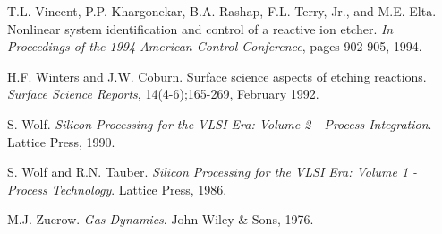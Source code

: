 \begin{thebibliography}{100}
	 T.L. Vincent, P.P. Khargonekar, B.A. Rashap, F.L. Terry, Jr., and M.E. Elta. Nonlinear system identification and control of a reactive ion etcher. \emph{In Proceedings of the 1994 American Control Conference}, pages 902-905, 1994.

	
	 H.F. Winters and J.W. Coburn. Surface science aspects of etching reactions. \emph{Surface Science Reports}, 14(4-6);165-269, February 1992.
	
	 S. Wolf. \emph{Silicon Processing for the VLSI Era: Volume 2 - Process Integration}. Lattice Press, 1990.
	
	 S. Wolf and R.N. Tauber. \emph{Silicon Processing for the VLSI Era: Volume 1 - Process Technology}. Lattice Press, 1986.
	
	 M.J. Zucrow. \emph{Gas Dynamics}. John Wiley \& Sons, 1976.
	
\end{thebibliography}